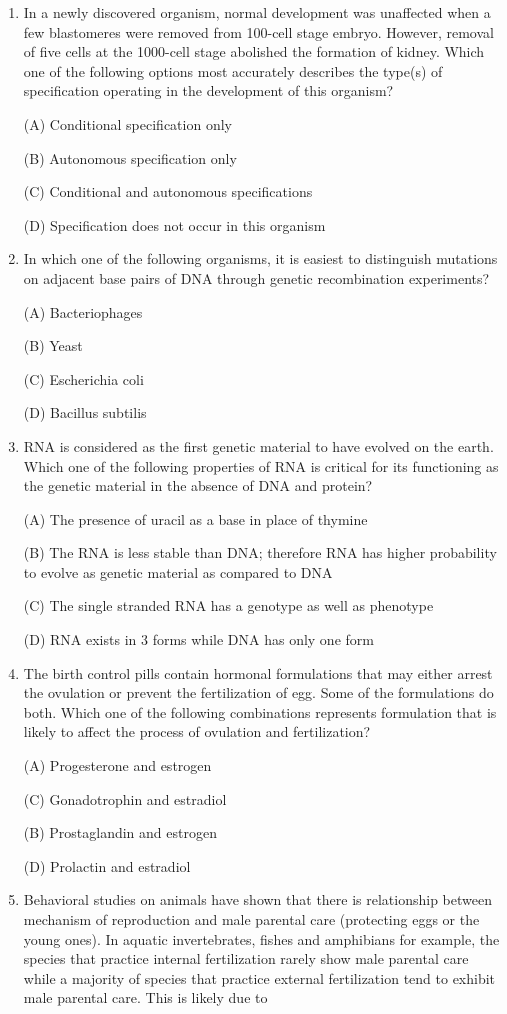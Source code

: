 \documentclass[journal]{IEEEtran}
\begin{document}
\begin{enumerate}
{(D) Gene(s) for eye colour may not be sex-linked
}

\item {In a newly discovered organism, normal development was unaffected when a few blastomeres were removed from 100-cell stage embryo. However, removal of five cells at the 1000-cell stage abolished the formation of kidney. Which one of the following options most accurately describes the type(s) of specification operating in the development of this organism?

(A) Conditional specification only

(B) Autonomous specification only

(C) Conditional and autonomous specifications

(D) Specification does not occur in this organism
}
\item{ In which one of the following organisms, it is easiest to distinguish mutations on adjacent base pairs of DNA through genetic recombination experiments?

(A) Bacteriophages

(B) Yeast

(C) Escherichia coli

(D) Bacillus subtilis
}
\item{ RNA is considered as the first genetic material to have evolved on the earth. Which one of the following properties of RNA is critical for its functioning as the genetic material in the absence of DNA and protein?

(A) The presence of uracil as a base in place of thymine

(B) The RNA is less stable than DNA; therefore RNA has higher probability to evolve as genetic material as compared to DNA

(C) The single stranded RNA has a genotype as well as phenotype

(D) RNA exists in 3 forms while DNA has only one form
}
\item{ The birth control pills contain hormonal formulations that may either arrest the ovulation or prevent the fertilization of egg. Some of the formulations do both. Which one of the following combinations represents formulation that is likely to affect the process of ovulation and fertilization?

(A) Progesterone and estrogen

(C) Gonadotrophin and estradiol

(B) Prostaglandin and estrogen

(D) Prolactin and estradiol
}
\item {Behavioral studies on animals have shown that there is relationship between mechanism of reproduction and male parental care (protecting eggs or the young ones). In aquatic invertebrates, fishes and amphibians for example, the species that practice internal fertilization rarely show male parental care while a majority of species that practice external fertilization tend to exhibit male parental care. This is likely due to

}
\end{enumerate}
\end{document}
